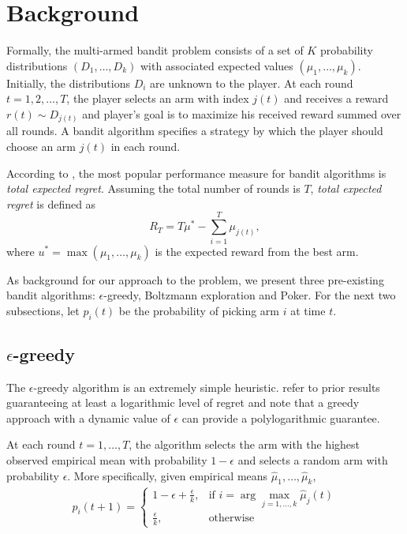 \documentclass[12pt]{article}
\begin{document}
\section{Background}
Formally, the multi-armed bandit problem consists of a set of $K$ probability distributions
$(D_1, \ldots, D_k)$ with associated expected values $(\mu_1, \ldots, \mu_k)$.
Initially, the distributions $D_i$ are unknown to the player.  At each round $t = 1,2,\ldots,T$, the player selects an arm with index $j(t)$
and receives a reward $r(t) \sim D_{j(t)}$ and player's goal is to maximize his received reward summed over all rounds.  A bandit algorithm
specifies a strategy by which the player should choose an arm $j(t)$ in each round.

According to \cite{Kuleshov}, the most popular performance measure for bandit algorithms is \emph{total expected regret}.  Assuming the 
total number of rounds is $T$, \emph{total expected regret} is defined as
$$
R_T = T\mu^{*} - \sum_{i=1}^{T} \mu_{j(t)},
$$
where $u^{*} = \max(\mu_1, \ldots, \mu_k)$ is the expected reward from the best arm. 

As background for our approach to the problem, we present three pre-existing bandit algorithms: $\epsilon$-greedy, Boltzmann exploration and Poker.
For the next two subsections, let $p_i(t)$ be the probability of picking arm $i$ at time $t$.

\subsection{$\epsilon$-greedy}

The $\epsilon$-greedy algorithm is an extremely simple heuristic. \cite{Auer} refer to prior results guaranteeing at least a logarithmic level of regret and note that a greedy approach with a dynamic value of $\epsilon$ can provide a polylogarithmic guarantee.

At each round $t = 1, \ldots, T$, the algorithm selects the arm with the highest observed empirical mean with probability $1 - \epsilon$ and
selects a random arm with probability $\epsilon$.  More specifically, given empirical means $\hat{\mu}_1, \ldots, \hat{\mu}_k$,
\begin{align*}
p_i(t+1) = 
\begin{cases}
1 - \epsilon + \frac{\epsilon}{k}, & \textrm{if } i = \arg \max_{j = 1, \ldots, k} \hat{\mu}_j(t) \\
\frac{\epsilon}{k}, & \textrm{otherwise}
\end{cases}
\end{align*}
\end{document}
